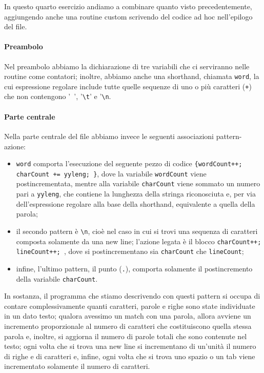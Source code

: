 \documentclass[class=book, crop=false, oneside, 12pt]{standalone}
\begin{document}

In questo quarto esercizio andiamo a combinare quanto visto precedentemente, aggiungendo anche una routine custom scrivendo del codice ad hoc nell'epilogo del file.

\paragraph{Preambolo}
Nel preambolo abbiamo la dichiarazione di tre variabili che ci serviranno nelle routine come contatori; inoltre, abbiamo anche una shorthand, chiamata \texttt{word}, la cui espressione regolare include tutte quelle sequenze di uno o più caratteri (\texttt{+}) che non contengono '\texttt{ }', '\texttt{\textbackslash t}' e '\texttt{\textbackslash n}.

\paragraph{Parte centrale}
Nella parte centrale del file abbiamo invece le seguenti associazioni pattern-azione:

\begin{itemize}
    \item \texttt{word} comporta l'esecuzione del seguente pezzo di codice \texttt{\{wordCount++; charCount += yyleng; \}}, dove la variabile \texttt{wordCount} viene postincrementata, mentre alla variabile \texttt{charCount} viene sommato un numero pari a \texttt{yyleng}, che contiene la lunghezza della stringa riconosciuta e, per via dell'espressione regolare alla base della shorthand, equivalente a quella della parola;
    \item il secondo pattern è \texttt{\textbackslash n}, cioè nel caso in cui si trovi una sequenza di caratteri composta solamente da una new line; l'azione legata è il blocco \texttt{{charCount++; lineCount++; }}, dove si postincrementano sia \texttt{charCount} che \texttt{lineCount};
    \item infine, l'ultimo pattern, il punto (\texttt{.}), comporta solamente il postincremento della variabile \texttt{charCount}.
\end{itemize}

In sostanza, il programma che stiamo descrivendo con questi pattern si occupa di contare complessivamente quanti caratteri, parole e righe sono state individuate in un dato testo; qualora avessimo un match con una parola, allora avviene un incremento proporzionale al numero di caratteri che costituiscono quella stessa parola e, inoltre, si aggiorna il numero di parole totali che sono contenute nel testo; ogni volta che si trova una new line si incrementano di un'unità il numero di righe e di caratteri e, infine, ogni volta che si trova uno spazio o un tab viene incrementato solamente il numero di caratteri. 
\end{document}
